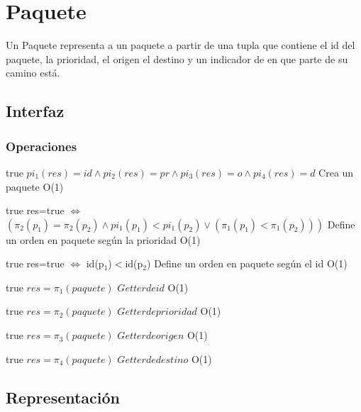 \section{Paquete}

Un Paquete representa a un paquete a partir de una tupla que contiene el id del paquete, la prioridad, el origen el destino y un indicador de en que parte de su camino est\'a. 

\subsection{Interfaz}



\subsubsection*{Operaciones}

 {true}
 {$pi_1(res)=id \land pi_2(res)=pr \land pi_3(res)=o \land pi_4(res)=d$}
 {Crea un paquete}
 {O(1)}
 {}
 
 {true}
 {res=true $\iff$ $(\pi_2(p_1)=\pi_2(p_2) \land pi_1(p_1)<pi_1(p_2) \lor (\pi_1(p_1)<\pi_1(p_2)))$}
 {Define un orden en paquete seg\'un la prioridad}
 {O(1)}
 {}
 
 {true}
 {res=true $\iff$ id(p$_1$)$<$id(p$_2$)}
 {Define un orden en paquete seg\'un el id}
 {O(1)}
 {}
 
 {true}
 {$res = \pi_1(paquete)$}
 {$Getter de id$}
 {O(1)}
 {}
 
 {true}
 {$res = \pi_2(paquete)$}
 {$Getter de prioridad$}
 {O(1)}
 {}
 
 {true}
 {$res = \pi_3(paquete)$}
 {$Getter de origen$}
 {O(1)}
 {}
 
 {true}
 {$res = \pi_4(paquete)$}
 {$Getter de destino$}
 {O(1)}
 {} 
\subsection{Representación}


